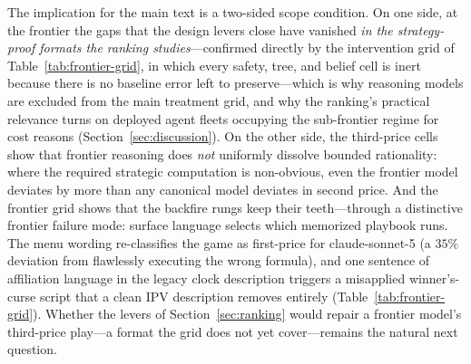 The implication for the main text is a two-sided scope condition. On one side, at the frontier the gaps that the design levers close have vanished \emph{in the strategy-proof formats the ranking studies}---confirmed directly by the intervention grid of Table~\ref{tab:frontier-grid}, in which every safety, tree, and belief cell is inert because there is no baseline error left to preserve---which is why reasoning models are excluded from the main treatment grid, and why the ranking's practical relevance turns on deployed agent fleets occupying the sub-frontier regime for cost reasons (Section~\ref{sec:discussion}). On the other side, the third-price cells show that frontier reasoning does \emph{not} uniformly dissolve bounded rationality: where the required strategic computation is non-obvious, even the frontier model deviates by more than any canonical model deviates in second price. And the frontier grid shows that the backfire rungs keep their teeth---through a distinctive frontier failure mode: surface language selects which memorized playbook runs. The menu wording re-classifies the game as first-price for claude-sonnet-5 (a $35\%$ deviation from flawlessly executing the wrong formula), and one sentence of affiliation language in the legacy clock description triggers a misapplied winner's-curse script that a clean IPV description removes entirely (Table~\ref{tab:frontier-grid}). Whether the levers of Section~\ref{sec:ranking} would repair a frontier model's third-price play---a format the grid does not yet cover---remains the natural next question.

